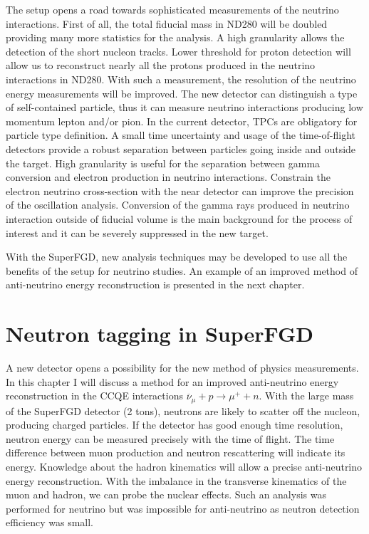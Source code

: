 \documentclass[main.tex]{subfiles}
\begin{document}
The setup opens a road towards sophisticated measurements of the neutrino interactions. First of all, the total fiducial mass in ND280 will be doubled providing many more statistics for the analysis. A high granularity allows the detection of the short nucleon tracks. Lower threshold for proton detection will allow us to reconstruct nearly all the protons produced in the neutrino interactions in ND280. With such a measurement, the resolution of the neutrino energy measurements will be improved. The new detector can distinguish a type of self-contained particle, thus it can measure neutrino interactions producing low momentum lepton and/or pion. In the current detector, TPCs are obligatory for particle type definition. A small time uncertainty and usage of the time-of-flight detectors provide a robust separation between particles going inside and outside the target. High granularity is useful for the separation between gamma conversion and electron production in neutrino interactions. Constrain the electron neutrino cross-section with the near detector can improve the precision of the oscillation analysis. Conversion of the gamma rays produced in neutrino interaction outside of fiducial volume is the main background for the process of interest and it can be severely suppressed in the new target.

With the SuperFGD, new analysis techniques may be developed to use all the benefits of the setup for neutrino studies. An example of an improved method of anti-neutrino energy reconstruction is presented in the next chapter.

\chapter{Neutron tagging in SuperFGD}
\label{ch:up:neutron}
A new detector opens a possibility for the new method of physics measurements. In this chapter I will discuss a method for an improved anti-neutrino energy reconstruction in the CCQE interactions $\overline{\nu}_\mu+p\to\mu^++n$. With the large mass of the SuperFGD detector (2 tons), neutrons are likely to scatter off the nucleon, producing charged particles. If the detector has good enough time resolution, neutron energy can be measured precisely with the time of flight. The time difference between muon production and neutron rescattering will indicate its energy. Knowledge about the hadron kinematics will allow a precise anti-neutrino energy reconstruction. With the imbalance in the transverse kinematics of the muon and hadron, we can probe the nuclear effects. Such an analysis was performed for neutrino but was impossible for anti-neutrino as neutron detection efficiency was small.
\end{document}
